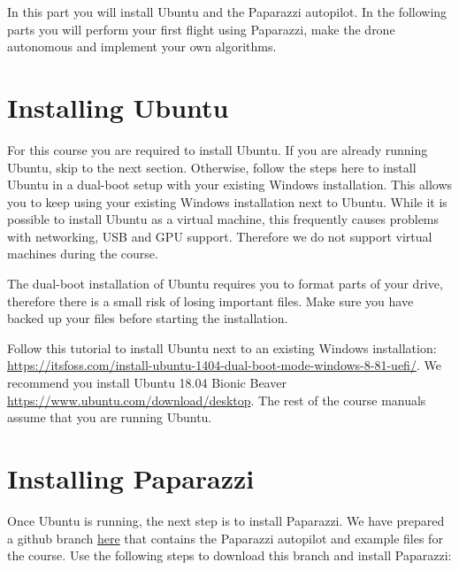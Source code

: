 \documentclass{article}
\begin{document}

In this part you will install Ubuntu and the Paparazzi autopilot.
In the following parts you will perform your first flight using Paparazzi, make the drone autonomous and implement your own algorithms.


\section{Installing Ubuntu}
For this course you are required to install Ubuntu.
If you are already running Ubuntu, skip to the next section.
Otherwise, follow the steps here to install Ubuntu in a dual-boot setup with your existing Windows installation.
This allows you to keep using your existing Windows installation next to Ubuntu.
While it is possible to install Ubuntu as a virtual machine, this frequently causes problems with networking, USB and GPU support. Therefore we do not support virtual machines during the course.

The dual-boot installation of Ubuntu requires you to format parts of your drive, therefore there is a small risk of losing important files.
Make sure you have backed up your files before starting the installation.

Follow this tutorial to install Ubuntu next to an existing Windows installation: \url{https://itsfoss.com/install-ubuntu-1404-dual-boot-mode-windows-8-81-uefi/}. We recommend you install Ubuntu 18.04 Bionic Beaver \url{https://www.ubuntu.com/download/desktop}. The rest of the course manuals assume that you are running Ubuntu.



\section{Installing Paparazzi}
Once Ubuntu is running, the next step is to install Paparazzi.
We have prepared a github branch \href{https://github.com/tudelft/paparazzi/tree/mavlabCourse2019}{here} that contains the Paparazzi autopilot and example files for the course. Use the following steps to download this branch and install Paparazzi:
\end{document}
